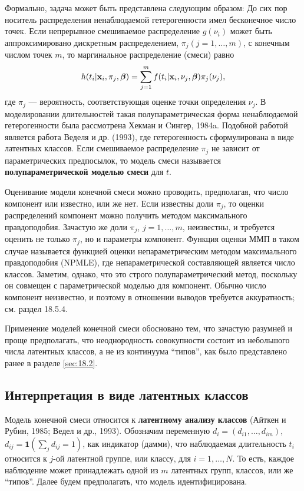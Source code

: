 Формально, задача может быть представлена следующим образом: До сих пор носитель распределения ненаблюдаемой гетерогенности имел бесконечное число точек. Если непрерывное смешиваемое распределение $g(\nu_i)$ может быть аппроксимировано дискретным распределением, $\pi_j(j = 1, \ldots, m)$, с конечным числом точек $m$, то маргинальное распределение (смеси) равно
    \begin{align}
        \label{eq:18.18}
        h(t_i|\mathbf{x}_i,\pi_j,\bm{\beta}) = \sum^{m}_{j=1} f(t_i|\mathbf{x}_i, \nu_j, \bm{\beta}) \pi_j(\nu_j),
    \end{align}
где $\pi_j$ --- вероятность, соответствующая оценке точки определения $\nu_j$. В моделировании длительностей такая полупараметрическая форма ненаблюдаемой гетерогенности была рассмотрена Хекман и Cингер, 1984a. Подобной работой является работа Веделя и др. (1993), где гетерогенность сформулирована в виде латентных классов. Если смешиваемое распределение $\pi_j$ не зависит от параметрических предпосылок, то модель смеси называется \textbf{полупараметрической моделью смеси} для $t$.

Оценивание модели конечной смеси можно проводить, предполагая, что число компонент или известно, или же нет. Если известны доли $\pi_j$, то оценки распределений компонент можно получить методом максимального правдоподобия. Зачастую же доли $\pi_j$, $j=1,\ldots,m$, неизвестны, и требуется оценить не только $\pi_j$, но и параметры компонент. Функция оценки ММП в таком случае называется функцией оценки непараметрическим методом максимального правдоподобия (NPMLE), где непараметрической составляющей является число классов. Заметим, однако, что это строго полупараметрический метод, поскольку он совмещен с параметрической моделью для компонент. Обычно число компонент неизвестно, и поэтому в отношении выводов требуется аккуратность; см. раздел 18.5.4. %

Применение моделей конечной смеси обосновано тем, что зачастую разумней и проще предполагать, что неоднородность совокупности состоит из небольшого числа латентных классов, а не из континуума ``типов'', как было представлено ранее в разделе \ref{sec:18.2}.




\subsection{Интерпретация в виде латентных классов}\label{sec:18.5.2} %

\noindent
Модель конечной смеси относится к \textbf{латентному анализу классов} (Айткен и Рубин, 1985; Ведел и др., 1993). Обозначим переменную $d_{i} = (d_{i1}, \ldots, d_{im})$, $d_{ij} = \textbf{1}(\sum_jd_{ij} = 1)$, как индикатор (дамми), что наблюдаемая длительность $t_i$ относится к $j$-ой латентной группе, или классу, для $i = 1, \ldots, N$. То есть, каждое наблюдение может принадлежать одной из $m$ латентных групп, классов, или же ``типов''. Далее будем предполагать, что модель идентифицирована.

